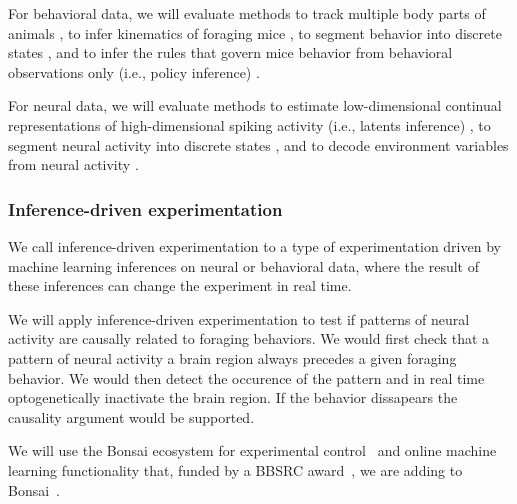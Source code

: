 For behavioral data, we will evaluate methods to track multiple body parts of
animals \citep[e.g.,][and a switching-linear-dyanamical method using RFIDs that
we will develop]{mathisEtAl18,pereiraEtAl22,bidermanEtAl24},
%
to infer kinematics of foraging mice \citep[e.g.,][]{ldspython,challaEtAl11},
%
to segment behavior into discrete states \citep[e.g.,][and a hierarchical HMM
that we will develop]{wiltschkoEtAl15,hsuAndYttri21},
%
and to infer the rules that govern mice behavior from behavioral observations
only (i.e., policy inference) \citep[e.g.,][]{ziebartEtAl08,zhuEtAl23}.

For neural data, we will evaluate methods to estimate low-dimensional continual
representations of high-dimensional spiking activity (i.e., latents inference)
\citep[e.g.,][]{mackeEtAl11,dunckerAndSahani18,pandarinathEtAl18,saniEtAl21},
%
to segment neural activity into discrete states
\citep[e.g.,][]{chenEtAl09,escolaEtAl11},
%
and to decode environment variables from neural activity
\citep[e.g.,][]{dengEtAl15,kloostermanEtAl14,tampuuEtAl19}.

\subsubsection{Inference-driven experimentation}

We call inference-driven experimentation to a type of experimentation driven by
machine learning inferences on neural or behavioral data, where the result of
these inferences can change the experiment in real time.

We will apply inference-driven experimentation to test if patterns of neural
activity are causally related to foraging behaviors.
%
We would first check that a pattern of neural activity a brain region always
precedes a given foraging behavior. We would then detect the occurence of the
pattern and in real time optogenetically inactivate the brain region.
If the behavior dissapears the causality argument would be supported.

We will use the Bonsai ecosystem for experimental control~\citep{bonsai} and
online machine learning functionality that, funded by a BBSRC
award~\citep{bbsrcAward}, we are adding to Bonsai~\citep{bonsaiML}.

